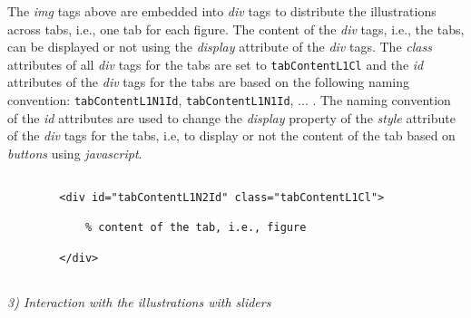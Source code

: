 \documentclass[12pt]{article}
\begin{document}
The \emph{img} tags above are embedded into \emph{div} tags to distribute the illustrations across tabs, i.e., one tab for each figure. 
%
The content of the \emph{div} tags, i.e., the tabs, can be displayed or not using the \emph{display} attribute of the \emph{div} tags. 
%
The \emph{class} attributes of all \emph{div} tags for the tabs are set to \texttt{tabContentL1Cl} and the \emph{id} attributes of the \emph{div} tags for the tabs are based on the following naming convention: \texttt{tabContentL1N1Id}, \texttt{tabContentL1N1Id}, ... . 
%
The naming convention of the \emph{id} attributes are used to change the \emph{display} property of the \emph{style} attribute of the \emph{div} tags for the tabs, i.e, to display or not the content of the tab based on \emph{buttons} using \emph{javascript}. 
%
\begin{CodeSnippet}[!hp]
	\centering
	\caption{\emph{Html} code snippet for integration of a tab}
	\footnotesize
	\vspace{0.25cm}
	\begin{BVerbatim}
		
		<div id="tabContentL1N2Id" class="tabContentL1Cl">
		
		
		</div>
		
	\end{BVerbatim}
	\label{HtmlCodSniDivTabTag}
\end{CodeSnippet}


\vspace{1em}
\noindent\emph{3) Interaction with the illustrations with sliders}
\end{document}
